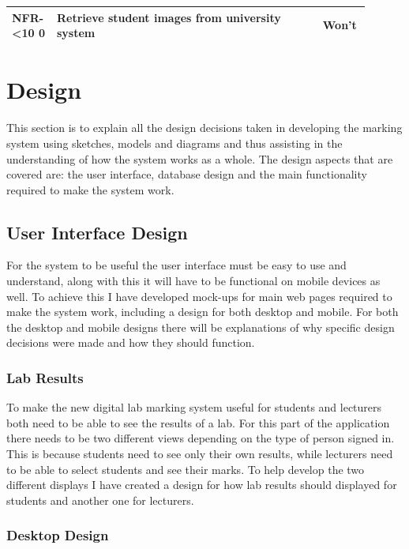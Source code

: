 \documentclass[11pt]{report}
\newcommand{\rid}[1]{\centering #1-\ifnum\value{requirement}<10 0\fi\arabic{requirement}
\stepcounter{requirement}}
\begin{document}
\begin{spacing}{1.25}
\begin{longtable}{|p{0.1\linewidth}|p{0.7\linewidth}|p{0.1\linewidth}|}
\rid{NFR} & Retrieve student images from university system & Won't\\ \hline

\end{longtable}
\end{spacing}
\setcounter{requirement}{1}


\newpage
\chapter{Design}
This section is to explain all the design decisions taken in developing the marking system using sketches, models and diagrams and thus assisting in the understanding of how the system works as a whole. The design aspects that are covered are: the user interface, database design and the main functionality required to make the system work. 

\section{User Interface Design}
For the system to be useful the user interface must be easy to use and understand, along with this it will have to be functional on mobile devices as well. To achieve this I have developed mock-ups for main web pages required to make the system work, including a design for both desktop and mobile. For both the desktop and mobile designs there will be explanations of why specific design decisions were made and how they should function.



\subsection{Lab Results}
To make the new digital lab marking system useful for students and lecturers both need to be able to see the results of a lab. For this part of the application there needs to be two different views depending on the type of person signed in. This is because students need to see only their own results, while lecturers need to be able to select students and see their marks. To help develop the two different displays I have created a design for how lab results should displayed for students and another one for lecturers.

\subsection*{Desktop Design}
\end{document}
